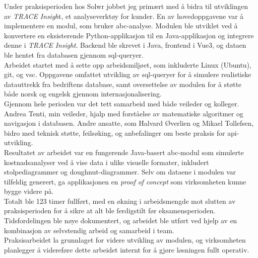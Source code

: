 Under praksisperioden hos Solwr jobbet jeg primært med å bidra til utviklingen av \textit{TRACE Insigh}t, et analyseverktøy for kunder. En av hovedoppgavene var å implementere en modul, som bruker \gls{abc}-analyse. Modulen ble utviklet ved å konvertere en eksisterende Python-applikasjon til en Java-applikasjon og integrere denne i \textit{TRACE Insight}. Backend ble skrevet i Java, frontend i Vue3, og dataen ble hentet fra databasen gjennom \gls{sql}-queryer. \\

Arbeidet startet med å sette opp arbeidsmiljøet, som inkluderte Linux (Ubuntu), \Gls{git}, og \gls{vsc}. Oppgavene omfattet utvikling av \gls{sql}-queryer for å simulere realistiske datauttrekk fra bedriftens database, samt oversettelse av modulen for å støtte både norsk og engelsk gjennom internasjonalisering. \\

Gjennom hele perioden var det tett samarbeid med både veileder og kolleger. Andrea Tenti, min veileder, hjalp med forståelse av matematiske algoritmer og navigasjon i databasen. Andre ansatte, som Halvard Øverlien og Mikael Tollefsen, bidro med teknisk støtte, feilsøking, og anbefalinger om beste praksis for \gls{api}-utvikling. \\

Resultatet av arbeidet var en fungerende Java-basert \gls{abc}-modul som simulerte kostnadsanalyser ved å vise data i ulike visuelle formater, inkludert stolpediagrammer og doughnut-diagrammer. Selv om dataene i modulen var tilfeldig generert, ga applikasjonen en \textit{proof of concept} som virksomheten kunne bygge videre på. \\

Totalt ble 123 timer fullført, med en økning i arbeidsmengde mot slutten av praksisperioden for å sikre at alt ble ferdigstilt før eksamensperioden. Tidsfordelingen ble nøye dokumentert, og arbeidet ble utført ved hjelp av en kombinasjon av selvstendig arbeid og samarbeid i team. \\

Praksisarbeidet la grunnlaget for videre utvikling av modulen, og virksomheten planlegger å videreføre dette arbeidet internt for å gjøre løsningen fullt operativ.

